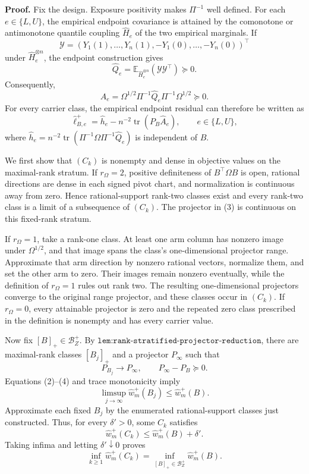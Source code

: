\textbf{Proof.}
Fix the design.  Exposure positivity makes \(\Pi^{-1}\) well defined.  For each \(e\in\{L,U\}\), the empirical endpoint covariance is attained by the comonotone or antimonotone quantile coupling \(\widehat H_e\) of the two empirical marginals.  If
\[
\mathcal Y=(Y_1(1),\ldots,Y_n(1),-Y_1(0),\ldots,-Y_n(0))^{\top}
\]
under \(\widehat H_e^{\otimes n}\), the endpoint construction gives
\[
\widehat Q_e=\mathbb E_{\widehat H_e^{\otimes n}}(\mathcal Y\mathcal Y^{\top})\succeq0.
\tag{1}
\]
Consequently,
\[
\widehat A_e
=\Omega^{1/2}\Pi^{-1}\widehat Q_e\Pi^{-1}\Omega^{1/2}
\succeq0.
\tag{2}
\]
For every carrier class, the empirical endpoint residual can therefore be written as
\[
\widehat\ell_{B,e}^+
=\widehat h_e-n^{-2}\operatorname{tr}(P_B\widehat A_e),
\qquad e\in\{L,U\},
\tag{3}
\]
where \(\widehat h_e=n^{-2}\operatorname{tr}(\Pi^{-1}\Omega\Pi^{-1}\widehat Q_e)\) is independent of \(B\).

We first show that \((C_k)\) is nonempty and dense in objective values on the maximal-rank stratum.  If \(r_\Omega=2\), positive definiteness of \(B^{\top}\Omega B\) is open, rational directions are dense in each signed pivot chart, and normalization is continuous away from zero.  Hence rational-support rank-two classes exist and every rank-two class is a limit of a subsequence of \((C_k)\).  The projector in (3) is continuous on this fixed-rank stratum.

If \(r_\Omega=1\), take a rank-one class.  At least one arm column has nonzero image under \(\Omega^{1/2}\), and that image spans the class's one-dimensional projector range.  Approximate that arm direction by nonzero rational vectors, normalize them, and set the other arm to zero.  Their images remain nonzero eventually, while the definition of \(r_\Omega=1\) rules out rank two.  The resulting one-dimensional projectors converge to the original range projector, and these classes occur in \((C_k)\).  If \(r_\Omega=0\), every attainable projector is zero and the repeated zero class prescribed in the definition is nonempty and has every carrier value.

Now fix \([B]_+\in\mathcal B_Z^+\).  By \(\texttt{lem:rank-stratified-projector-reduction}\), there are maximal-rank classes \([B_j]_+\) and a projector \(P_\infty\) such that
\[
P_{B_j}\longrightarrow P_\infty,
\qquad P_\infty-P_B\succeq0.
\tag{4}
\]
Equations (2)--(4) and trace monotonicity imply
\[
\limsup_{j\to\infty}\widehat w_m^+(B_j)
\le \widehat w_m^+(B).
\tag{5}
\]
Approximate each fixed \(B_j\) by the enumerated rational-support classes just constructed.  Thus, for every \(\delta'>0\), some \(C_k\) satisfies
\[
\widehat w_m^+(C_k)\le\widehat w_m^+(B)+\delta'.
\tag{6}
\]
Taking infima and letting \(\delta'\downarrow0\) proves
\[
\inf_{k\ge1}\widehat w_m^+(C_k)
=\inf_{[B]_+\in\mathcal B_Z^+}\widehat w_m^+(B).
\tag{7}
\]


